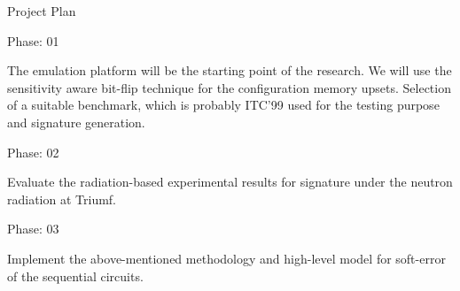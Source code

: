 \documentclass[aspectratio=1610]{beamer}
\begin{document}
\begin{frame}{Project Plan}



\begin{block}{Phase: 01}
\end{block}
The emulation platform will be the starting point of the research. We will use the sensitivity aware bit-flip technique for the configuration memory upsets. Selection of a suitable benchmark, which is probably ITC'99 used for the testing purpose and signature generation.





\begin{block}{Phase: 02}

\end{block}
Evaluate the radiation-based experimental results for signature under the neutron radiation at Triumf.


\begin{block}{Phase: 03}
\end{block}
Implement the above-mentioned methodology and high-level model for soft-error of the sequential circuits.





\end{frame}
\end{document}
